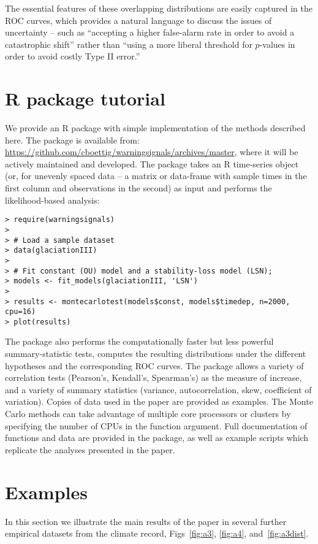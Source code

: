 \documentclass[authoryear, preprint,review,12pt]{elsarticle}
\begin{document}
The essential features of these overlapping distributions are easily captured in the ROC curves, which provides a natural language to discuss the issues of uncertainty -- such as ``accepting a higher false-alarm rate in order to avoid a catastrophic shift'' rather than ``using a more liberal threshold for $p$-values in order to avoid costly Type II error.''  



\section{R package tutorial}\label{R}
We provide an R package with simple implementation of the methods described here.  The package is available from: \href{https://github.com/cboettig/warningsignals/archives/master}{https://github.com/cboettig/warningsignals/archives/master}, where it will be actively maintained and developed.  The package takes an R time-series object (or, for unevenly spaced data -- a matrix or data-frame with sample times in the first column and observations in the second) as input and performs the likelihood-based analysis:

\begin{verbatim}
> require(warningsignals)
>
> # Load a sample dataset
> data(glaciationIII)
>
> # Fit constant (OU) model and a stability-loss model (LSN);
> models <- fit_models(glaciationIII, 'LSN')
>
> results <- montecarlotest(models$const, models$timedep, n=2000, cpu=16)
> plot(results)
\end{verbatim}

The package also performs the computationally faster but less powerful summary-statistic tests, computes the resulting distributions under the different hypotheses and the corresponding ROC curves.  The package allows a variety of correlation tests (Pearson's, Kendall's, Spearman's) as the measure of increase, and a variety of summary statistics (variance, autocorrelation, skew, coefficient of variation).  Copies of data used in the paper are provided as examples.  The Monte Carlo methods can take advantage of multiple core processors or clusters by specifying the number of CPUs in the function argument.   Full documentation of functions and data are provided in the package, as well as example scripts which replicate the analyses presented in the paper.   

\section{Examples}\label{examples}
In this section we illustrate the main results of the paper in several further empirical datasets from the climate record, Figs~\ref{fig:a3}, \ref{fig:a4}, and~\ref{fig:a3dist}.  
\end{document}
